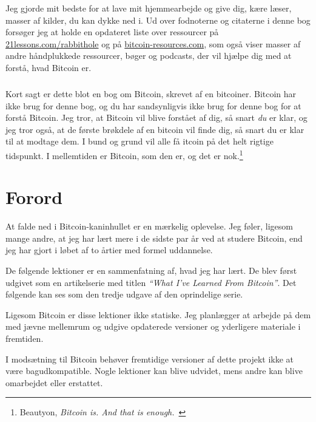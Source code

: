 \documentclass[paper=6in:9in,pagesize=pdftex,
               headinclude=on,footinclude=on,12pt]{scrbook}
\begin{document}
Jeg gjorde mit bedste for at lave mit hjemmearbejde og give dig, kære læser, masser af kilder, du kan dykke ned i. Ud over fodnoterne og citaterne i denne bog forsøger jeg at holde en opdateret liste over ressourcer på \href{https://21lessons.com/rabbithole}{21lessons.com/rabbithole} og på \href{https://bitcoin-resources.com}{bitcoin-resources.com}, som også viser masser af andre håndplukkede ressourcer, bøger og podcasts, der vil hjælpe dig med at forstå, hvad Bitcoin er.\paragraph{} Kort sagt er dette blot en bog om Bitcoin, skrevet af en bitcoiner. Bitcoin har ikke brug for denne bog, og du har sandsynligvis ikke brug for denne bog for at forstå Bitcoin. Jeg tror, at Bitcoin vil blive forstået af dig, så snart \textit{du} er klar, og jeg tror også, at de første brøkdele af en bitcoin vil finde dig, så snart du er klar til at modtage dem. I bund og grund vil alle få  \bitcoinB{}itcoin på det helt rigtige tidspunkt. I mellemtiden er Bitcoin, som den er, og det er nok.\footnote{Beautyon, \textit{Bitcoin is. And that is enough.}~\cite{bitcoin-is}}

\chapter*{Forord}

At falde ned i Bitcoin-kaninhullet er en mærkelig oplevelse. Jeg føler, ligesom mange andre, at jeg har lært mere i de sidste par år ved at studere Bitcoin, end jeg har gjort i løbet af to årtier med formel uddannelse.

De følgende lektioner er en sammenfatning af, hvad jeg har lært. De blev først udgivet som en artikelserie med titlen \textit{\enquote{What I’ve Learned From Bitcoin}}.%
%
%
 Det følgende kan ses som den tredje udgave af den oprindelige serie.

Ligesom Bitcoin er disse lektioner ikke statiske. Jeg planlægger at arbejde på dem med jævne mellemrum og udgive opdaterede versioner og yderligere materiale i fremtiden.

I modsætning til Bitcoin behøver fremtidige versioner af dette projekt ikke at være bagudkompatible. Nogle lektioner kan blive udvidet, mens andre kan blive omarbejdet eller erstattet.
\end{document}
